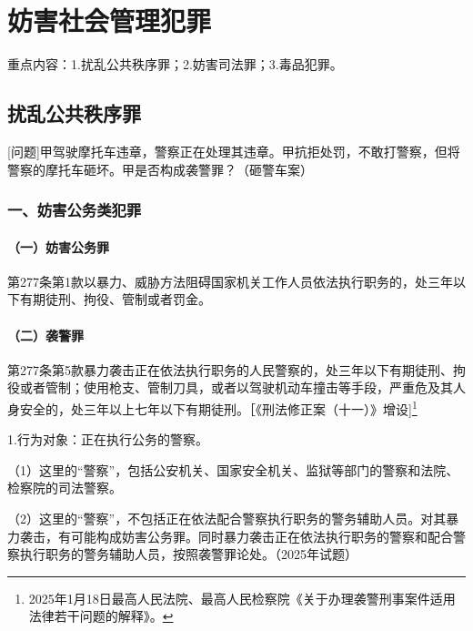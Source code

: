 \chapter{妨害社会管理犯罪}

\begin{EditionOpeningPanel}
重点内容：1.扰乱公共秩序罪；2.妨害司法罪；3.毒品犯罪。
\end{EditionOpeningPanel}

\section{扰乱公共秩序罪}

[问题]甲驾驶摩托车违章，警察正在处理其违章。甲抗拒处罚，不敢打警察，但将警察的摩托车砸坏。甲是否构成袭警罪？（砸警车案）

\subsection*{一、妨害公务类犯罪}

\subsubsection*{（一）妨害公务罪}

第277条第1款以暴力、威胁方法阻碍国家机关工作人员依法执行职务的，处三年以下有期徒刑、拘役、管制或者罚金。


\subsubsection*{（二）袭警罪}

第277条第5款暴力袭击正在依法执行职务的人民警察的，处三年以下有期徒刑、拘役或者管制；使用枪支、管制刀具，或者以驾驶机动车撞击等手段，严重危及其人身安全的，处三年以上七年以下有期徒刑。［《刑法修正案（十一）》增设]\footnote{2025年1月18日最高人民法院、最高人民检察院《关于办理袭警刑事案件适用法律若干问题的解释》。}

1.行为对象：正在执行公务的警察。

（1）这里的“警察”，包括公安机关、国家安全机关、监狱等部门的警察和法院、检察院的司法警察。

（2）这里的“警察”，不包括正在依法配合警察执行职务的警务辅助人员。对其暴力袭击，有可能构成妨害公务罪。同时暴力袭击正在依法执行职务的警察和配合警察执行职务的警务辅助人员，按照袭警罪论处。（2025年试题）

